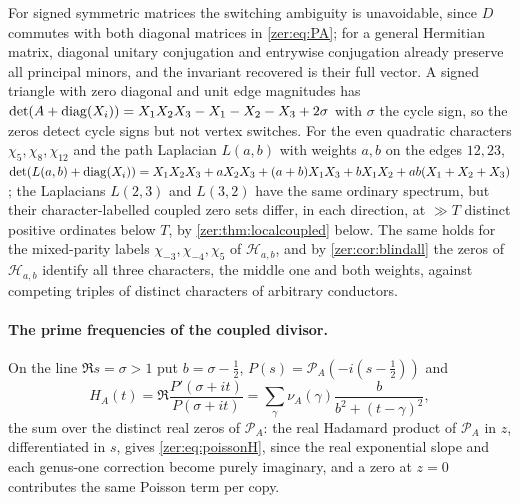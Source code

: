 For signed symmetric matrices the switching ambiguity is unavoidable, since $D$ commutes with both
diagonal matrices in \eqref{zer:eq:PA}; for a general Hermitian matrix, diagonal unitary conjugation and
entrywise conjugation already preserve all principal minors, and the invariant recovered is their full
vector. A signed triangle with zero diagonal and unit edge magnitudes has
$\det(A+\operatorname{diag}(X_i))=X_1X_2X_3-X_1-X_2-X_3+2\sigma$ with $\sigma$ the cycle sign, so the zeros detect cycle
signs but not vertex switches. For the even quadratic characters $\chi_5,\chi_8,\chi_{12}$ and the path
Laplacian $L(a,b)$ with weights $a,b$ on the edges $12,23$,
$\det(L(a,b)+\operatorname{diag}(X_i))=X_1X_2X_3+aX_2X_3+(a+b)X_1X_3+bX_1X_2+ab(X_1+X_2+X_3)$; the Laplacians
$L(2,3)$ and $L(3,2)$ have the same ordinary spectrum, but their character-labelled coupled zero sets
differ, in each direction, at $\gg T$ distinct positive ordinates below $T$, by
\cref{zer:thm:localcoupled} below. The same holds for the mixed-parity labels
$\chi_{-3},\chi_{-4},\chi_5$ of $\mathcal H_{a,b}$, and by \cref{zer:cor:blindall} the zeros of
$\mathcal H_{a,b}$ identify all three characters, the middle one and both weights, against competing
triples of distinct characters of arbitrary conductors.

\paragraph{The prime frequencies of the coupled divisor.}
On the line $\Re s=\sigma>1$ put $b=\sigma-\tfrac12$, $P(s)=\mathcal P_A(-i(s-\tfrac12))$ and
\begin{equation}\label{zer:eq:poissonH}
 H_A(t)=\Re\frac{P'(\sigma+it)}{P(\sigma+it)}=\sum_\gamma\nu_A(\gamma)\frac{b}{b^2+(t-\gamma)^2},
\end{equation}
the sum over the distinct real zeros of $\mathcal P_A$: the real Hadamard product of $\mathcal P_A$ in $z$,
differentiated in $s$, gives \eqref{zer:eq:poissonH}, since the real exponential slope and each genus-one
correction become purely imaginary, and a zero at $z=0$ contributes the same Poisson term per copy.

